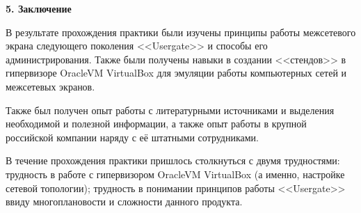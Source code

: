 \begin{center}
	\textbf{\Large 5. Заключение}
\end{center}

В результате прохождения практики были изучены принципы работы межсетевого экрана следующего поколения <<Usergate>> и способы его администрирования. Также были получены навыки в создании <<стендов>> в гипервизоре OracleVM VirtualBox для эмуляции работы компьютерных сетей и межсетевых экранов.
		
Также был получен опыт работы с литературными источниками и выделения необходимой и полезной информации, а также опыт работы в крупной российской компании наряду с её штатными сотрудниками.
		
В течение прохождения практики пришлось столкнуться с двумя трудностями: трудность в работе с гипервизором OracleVM VirtualBox (а именно, настройке сетевой топологии); трудность в понимании принципов работы <<Usergate>> ввиду многоплановости и сложности данного продукта.

\printbibliography[heading=bibintoc, title={Список литературы}]
